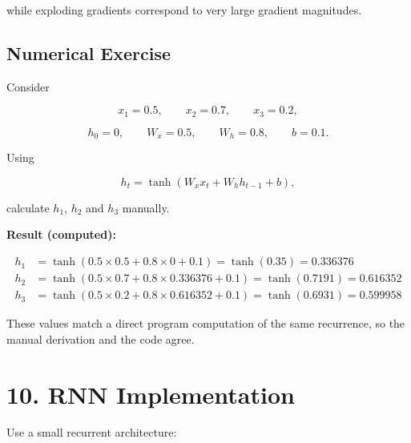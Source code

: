 \documentclass[10pt]{article}
\begin{document}
while exploding gradients correspond to very large gradient magnitudes.

\subsection*{Numerical Exercise}

Consider

\[
x_1=0.5,\qquad x_2=0.7,\qquad x_3=0.2,
\]

\[
h_0=0,\qquad W_x=0.5,\qquad W_h=0.8,\qquad b=0.1.
\]

Using

\[
h_t=\tanh(W_xx_t+W_hh_{t-1}+b),
\]

calculate $h_1$, $h_2$ and $h_3$ manually.

\textbf{Result (computed):}

\begin{align*}
h_1 &= \tanh(0.5\times0.5 + 0.8\times0 + 0.1) = \tanh(0.35) = 0.336376\\
h_2 &= \tanh(0.5\times0.7 + 0.8\times0.336376 + 0.1) = \tanh(0.7191) = 0.616352\\
h_3 &= \tanh(0.5\times0.2 + 0.8\times0.616352 + 0.1) = \tanh(0.6931) = 0.599958
\end{align*}

These values match a direct program computation of the same recurrence, so
the manual derivation and the code agree.

\section*{10. RNN Implementation}

Use a small recurrent architecture:

\begin{center}
\end{center}
\end{document}
